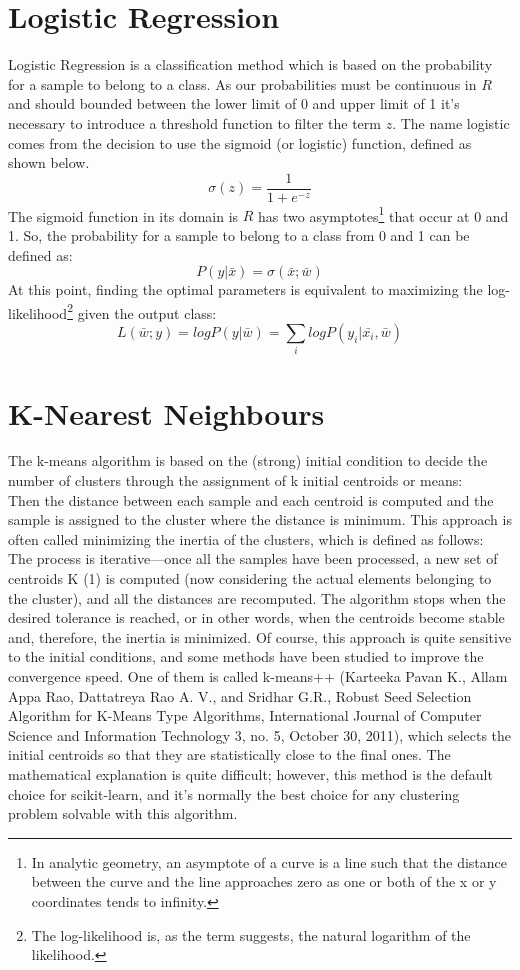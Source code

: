 \documentclass[12pt]{article}
\begin{document}
\newpage
\section{Logistic Regression}
Logistic Regression is a classification method which is based on the probability for a sample to belong to a class. As our probabilities must be continuous in $R$ and should bounded between the lower limit of 0 and upper limit of 1 it's necessary to introduce a threshold function to filter the term $z$. The name logistic comes from the decision to use the sigmoid (or logistic) function, defined as shown below.
$$\sigma(z)= \dfrac{1}{1+e^{-z}}$$
The sigmoid function in its domain is $R$ has two asymptotes\footnote{In analytic geometry, an asymptote of a curve is a line such that the distance between the curve and the line approaches zero as one or both of the x or y coordinates tends to infinity.} that occur at 0 and 1. So, the probability for a sample to belong to a class from 0 and 1 can be defined as:
$$P(y|\bar{x})=\sigma(\bar{x};\bar{w})$$
At this point, finding the optimal parameters is equivalent to maximizing the log-likelihood\footnote{The log-likelihood is, as the term suggests, the natural logarithm of the likelihood.}
given the output class:
$$L(\bar{w};y) = log P(y|\bar{w}) = \sum_{i} log P(y_{i}|\bar{x_{i}}, \bar{w})$$


\newpage
\section{K-Nearest Neighbours}
The k-means algorithm is based on the (strong) initial condition to decide the number of
clusters through the assignment of k initial centroids or means:
\\
Then the distance between each sample and each centroid is computed and the sample is
assigned to the cluster where the distance is minimum. This approach is often called
minimizing the inertia of the clusters, which is defined as follows:
\\
The process is iterative—once all the samples have been processed, a new set of centroids K (1) is computed (now considering the actual elements belonging to the cluster), and all the distances are recomputed. The algorithm stops when the desired tolerance is reached, or in other words, when the centroids become stable and, therefore, the inertia is minimized. Of course, this approach is quite sensitive to the initial conditions, and some methods have been studied to improve the convergence speed. One of them is called k-means++ (Karteeka Pavan K., Allam Appa Rao, Dattatreya Rao A. V., and Sridhar G.R., Robust Seed Selection Algorithm for K-Means Type Algorithms, International Journal of Computer Science and Information Technology 3, no. 5, October 30, 2011), which selects the initial centroids so that they are statistically close to the final ones. The mathematical explanation is quite difficult; however, this method is the default choice for scikit-learn, and it's normally the best choice for any clustering problem solvable with this algorithm.
\end{document}
